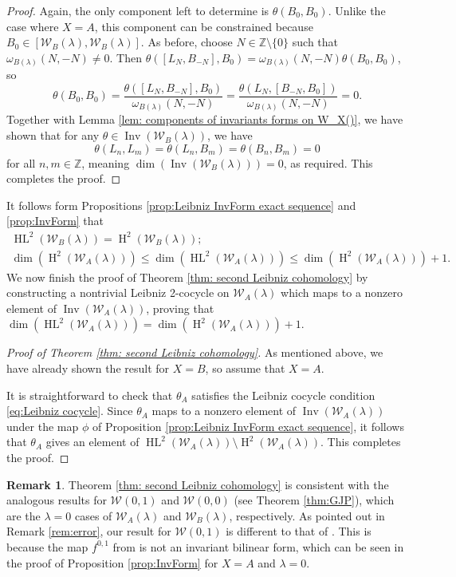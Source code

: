 \documentclass[11pt, svgnames]{amsart}
\DeclareMathOperator{\Inv}{Inv}
\newcommand{\ZZ}{\mathbb{Z}}
\newcommand{\W}{\mathcal{W}}
\DeclareMathOperator{\HH}{H}
\DeclareMathOperator{\HL}{HL}
\newcommand{\nonzero}{\setminus \{0\}}
\theoremstyle{definition}
\newtheorem{remark}[proposition]{Remark}
\begin{document}
\begin{proof}
    Again, the only component left to determine is $\theta(B_0, B_0)$. Unlike the case where $X=A$, this component can be constrained because $B_0 \in [\W_B(\lambda),\W_B(\lambda)]$. As before, choose $N \in \ZZ \nonzero$ such that $\omega_{B(\lambda)}(N,-N) \neq 0$. Then $\theta([L_N, B_{-N}], B_0) = \omega_{B(\lambda)}(N,-N)\theta(B_0,B_0)$, so
    $$\theta(B_0,B_0) = \frac{\theta([L_N, B_{-N}], B_0)}{\omega_{B(\lambda)}(N,-N)} = \frac{\theta(L_N, [B_{-N}, B_0])}{\omega_{B(\lambda)}(N,-N)} = 0.$$
    Together with Lemma \ref{lem: components of invariants forms on W_X()}, we have shown that for any $\theta \in \Inv(\W_B(\lambda))$, we have
    $$\theta(L_n,L_m) = \theta(L_n, B_m) = \theta(B_n,B_m) = 0$$
    for all $n,m \in \ZZ$, meaning $\dim(\Inv(\W_B(\lambda))) = 0$, as required. This completes the proof.
\end{proof}
It follows form Propositions \ref{prop:Leibniz InvForm exact sequence} and \ref{prop:InvForm} that
    $$\begin{gathered}
        \HL^2(\W_B(\lambda)) = \HH^2(\W_B(\lambda)); \\
        \dim(\HH^2(\W_A(\lambda))) \leq \dim(\HL^2(\W_A(\lambda))) \leq \dim(\HH^2(\W_A(\lambda))) + 1.
    \end{gathered}$$
We now finish the proof of Theorem \ref{thm: second Leibniz cohomology} by constructing a nontrivial Leibniz 2-cocycle on $\W_A(\lambda)$ which maps to a nonzero element of $\Inv(\W_A(\lambda))$, proving that $\dim(\HL^2(\W_A(\lambda))) = \dim(\HH^2(\W_A(\lambda))) + 1$.

\begin{proof}[Proof of Theorem \ref{thm: second Leibniz cohomology}]
    As mentioned above, we have already shown the result for $X = B$, so assume that $X = A$.
    
    It is straightforward to check that $\theta_A$ satisfies the Leibniz cocycle condition \eqref{eq:Leibniz cocycle}. Since $\theta_A$ maps to a nonzero element of $\Inv(\W_A(\lambda))$ under the map $\phi$ of Proposition \ref{prop:Leibniz InvForm exact sequence}, it follows that $\theta_A$ gives an element of $\HL^2(\W_A(\lambda)) \setminus \HH^2(\W_A(\lambda))$. This completes the proof.
\end{proof}

\begin{remark}
    Theorem \ref{thm: second Leibniz cohomology} is consistent with the analogous results for $\W(0,1)$ and $\W(0,0)$ (see Theorem \ref{thm:GJP}), which are the $\lambda=0$ cases of $\W_A(\lambda)$ and $\W_B(\lambda)$, respectively. As pointed out in Remark \ref{rem:error}, our result for $\W(0,1)$ is different to that of \cite[Theorem 3.5]{GaoJiangPei}. This is because the map $f^{0,1}$ from \cite[Lemma 3.2]{GaoJiangPei} is not an invariant bilinear form, which can be seen in the proof of Proposition \ref{prop:InvForm} for $X = A$ and $\lambda = 0$.
\end{remark}
\end{document}
